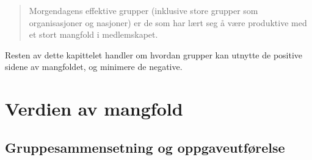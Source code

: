 \documentclass[11pt]{article}
\begin{document}
		\begin{quote} Morgendagens effektive grupper (inklusive store grupper som organisasjoner og nasjoner) er de som har lært seg å være produktive med et stort mangfold i medlemskapet. \end{quote}
		
		Resten av dette kapittelet handler om hvordan grupper kan utnytte de positive sidene av mangfoldet, og minimere de negative.
		
	\section{Verdien av mangfold}
		\subsection{Gruppesammensetning og oppgaveutførelse}
			
\end{document}
